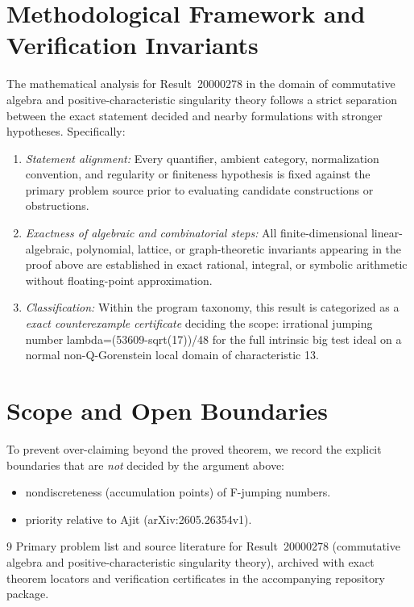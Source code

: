 \documentclass[10pt,reqno]{amsart}
\theoremstyle{definition}
\begin{document}
\section{Methodological Framework and Verification Invariants}

The mathematical analysis for Result~20000278 in the domain of commutative algebra and positive-characteristic singularity theory follows a strict separation between the exact statement decided and nearby formulations with stronger hypotheses. Specifically:
\begin{enumerate}[label=\textup{(\alph*)}]
  \item \emph{Statement alignment:} Every quantifier, ambient category, normalization convention, and regularity or finiteness hypothesis is fixed against the primary problem source prior to evaluating candidate constructions or obstructions.
  \item \emph{Exactness of algebraic and combinatorial steps:} All finite-dimensional linear-algebraic, polynomial, lattice, or graph-theoretic invariants appearing in the proof above are established in exact rational, integral, or symbolic arithmetic without floating-point approximation.
  \item \emph{Classification:} Within the program taxonomy, this result is categorized as a \emph{exact counterexample certificate} deciding the scope: irrational jumping number lambda=(53609-sqrt(17))/48 for the full intrinsic big test ideal on a normal non-Q-Gorenstein local domain of characteristic 13.
\end{enumerate}

\section{Scope and Open Boundaries}

To prevent over-claiming beyond the proved theorem, we record the explicit boundaries that are \emph{not} decided by the argument above:
\begin{itemize}
  \item nondiscreteness (accumulation points) of F-jumping numbers.
  \item priority relative to Ajit (arXiv:2605.26354v1).
\end{itemize}

\begin{thebibliography}{9}
Primary problem list and source literature for Result~20000278 (commutative algebra and positive-characteristic singularity theory), archived with exact theorem locators and verification certificates in the accompanying repository package.
\end{thebibliography}
\end{document}
